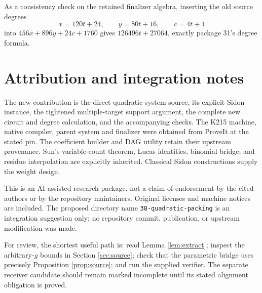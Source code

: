 \documentclass[11pt]{article}
\newcommand{\file}[1]{\nolinkurl{#1}}
\theoremstyle{definition}
\theoremstyle{remark}
\numberwithin{equation}{section}
\begin{document}
As a consistency check on the retained finalizer algebra, inserting the
old source degrees
\[
 x=120t+24,\qquad y=80t+16,\qquad c=4t+1
\]
into \(456x+896y+24c+1760\) gives
\(126496t+27064\), exactly package 31's degree formula.

\section{Attribution and integration notes}
\label{app:integration}

The new contribution is the direct quadratic-system source, its explicit
Sidon instance, the tightened multiple-target support argument, the
complete new circuit and degree calculation, and the accompanying checks.
The K215 machine, native compiler, parent system and finalizer were
obtained from ProveIt at the stated pin. The coefficient builder and DAG
utility retain their upstream provenance. Sun's variable-count theorem,
Lucas identities, binomial bridge, and residue interpolation are explicitly
inherited. Classical Sidon constructions supply the weight design.

This is an AI-assisted research package, not a claim of endorsement by
the cited authors or by the repository maintainers. Original licenses
and machine notices are included. The proposed directory name
\file{38-quadratic-packing} is an integration suggestion only; no repository
commit, publication, or upstream modification was made.

For review, the shortest useful path is:
read Lemma \ref{lem:extract}; inspect the arbitrary-\(g\) bounds in
Section \ref{sec:source}; check that the parametric bridge uses precisely
Proposition \ref{prop:source}; and run the supplied verifier.
The separate receiver candidate should remain marked incomplete until
its stated alignment obligation is proved.
\end{document}
